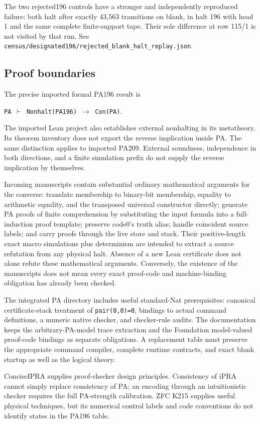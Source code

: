 The two rejected196 controls have a stronger and independently reproduced
failure: both halt after exactly 43,563 transitions on blank, in halt 196
with head 1 and the same complete finite-support tape. Their sole difference
at row 115/1 is not visited by that run. See
\nolinkurl{census/designated196/rejected_blank_halt_replay.json}.

\subsection{Proof boundaries}

The precise imported formal PA196 result is

\texttt{PA $\vdash$ Nonhalt(PA196) $\to$ Con(PA)}.

The imported Lean project also establishes external nonhalting in its
metatheory. Its theorem inventory does not export the reverse implication
inside PA. The same distinction applies to imported PA209. External
soundness, independence in both directions, and a finite simulation prefix
do not supply the reverse implication by themselves.

Incoming manuscripts contain substantial ordinary mathematical arguments
for the converse: translate membership to binary-bit membership, equality
to arithmetic equality, and the transposed universal constructor directly;
generate PA proofs of finite comprehension by substituting the input formula
into a full-induction proof template; preserve code0's truth alias; handle
coincident source labels; and carry proofs through the live store and stack.
Their positive-length exact macro simulations plus determinism are intended
to extract a source refutation from any physical halt. Absence of a new Lean
certificate does not alone refute these mathematical arguments. Conversely,
the existence of the manuscripts does not mean every exact proof-code and
machine-binding obligation has already been checked.

The integrated PA directory includes useful standard-Nat prerequisites:
canonical certificate-stack treatment of \nolinkurl{pair(0,0)=0}, bindings to actual
command definitions, a numeric native checker, and checker-rule audits.
The documentation keeps the arbitrary-PA-model trace extraction and the
Foundation model-valued proof-code bindings as separate obligations. A
replacement table must preserve the appropriate command compiler, complete
runtime contracts, and exact blank startup as well as the logical theory.

ConciseIPRA supplies proof-checker design principles. Consistency of iPRA
cannot simply replace consistency of PA; an encoding through an
intuitionistic checker requires the full PA-strength calibration. ZFC K215
supplies useful physical techniques, but its numerical control labels and
code conventions do not identify states in the PA196 table.

